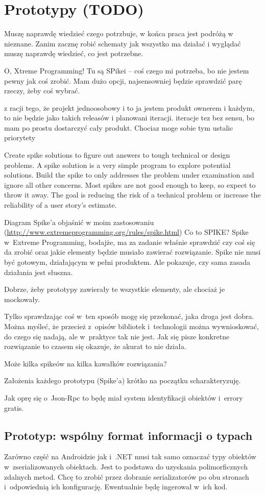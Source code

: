\section{Prototypy (TODO)}
Muszę naprawdę wiedzieć czego potrzbuje, w końca praca jest podróżą w nieznane. Zanim zacznę robić schematy jak wszystko ma działać i wyglądać muszę naprawdę wiedzieć, co jest potrzebne.

O, Xtreme Programming! Tu są SPikei -- coś czego mi potrzeba, bo nie jestem pewny jak coś zrobić. Mam dużo opcji, najsensowniej będzie sprawdzić parę rzeczy, żeby coś wybrać.

z racji tego, że projekt jednoosobowy i to ja jestem produkt ownerem i każdym, to nie będzie jako takich releasów i planowani iteracji. iteracje tez bez sensu, bo mam po prostu dostarczyć cały produkt. Chociaz moge sobie tym ustalic priorytety

Create spike solutions to figure out answers to tough technical or design problems. A spike solution is a very simple program to explore potential solutions. Build the spike to only addresses the problem under examination and ignore all other concerns. Most spikes are not good enough to keep, so expect to throw it away. The goal is reducing the risk of a technical problem or increase the reliability of a user story's estimate.

Diagram Spike'a objaśnić w moim zastosowaniu (\url{http://www.extremeprogramming.org/rules/spike.html})
Co to SPIKE? Spike w~Extreme Programming, bodajże, ma za zadanie właśnie sprawdzić czy coś się da zrobić oraz jakie elementy będzie musiało zawierać rozwiązanie.
Spike nie musi być gotowym, działającym w pełni produktem. Ale pokazuje, czy sama zasada działania jest słuszna.


Dobrze, żeby prototypy zawierały te wszystkie elementy, ale chociaż je mockowały.

Tylko sprawdzając coś w~ten sposób mogę się przekonać, jaka droga jest dobra. Można myśleć, że przecież z~opisów bibliotek i~technologii można wywnioskować, do czego się nadają, ale w~praktyce tak nie jest. Jak się pisze konkretne rozwiązanie to czasem się okazuje, że akurat to nie działa.


Może kilka spikeów na kilka kawałków rozwiązania?

Założenia każdego prototypu (Spike'a) krótko na początku scharakteryzuję.

Jak oprę się o~Json-Rpc to będę miał system identyfikacji obiektów i~errory gratis.

\subsection{Prototyp: wspólny format informacji o typach}
Zarówno część na Androidzie jak i~.NET musi tak samo oznaczać typy obiektów w~zserializowanych obiektach.
Jest to podstawa do uzyskania polimorficznych zdalnych metod.
Chcę to zrobić przez dobranie serializatorów po obu stronach i~odpowiednią ich konfigurację. Ewentualnie będę ingerował w~ich kod.

